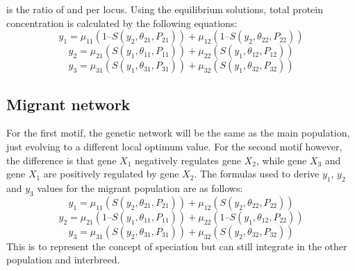 \textit{\textmu} is the ratio of \textalpha and \textgamma per locus. Using the equilibrium solutions, total protein concentration is calculated by the following equations:
\begin{equation*}
    y_1 = \mu_{11}(1 – S(y_2, \theta_{21}, P_{21})) + \mu_{12}(1 – S(y_{2}, \theta_{22}, P_{22})) \label{eq:y1 function} \tag{5.1}
\end{equation*}
\begin{equation*}
    y_2 = \mu_{21}(S(y_{1}, \theta_{11}, P_{11})) + \mu_{22}(S(y_{1}, \theta_{12}, P_{12})) \label{eq:y2 function} \tag{5.2}
\end{equation*}
\begin{equation*}
    y_3 = \mu_{31}(S(y_{1}, \theta_{31}, P_{31})) + \mu_{32}(S(y_{1}, \theta_{32}, P_{32})) \label{eq:y3 function} \tag{5.3}
\end{equation*}
\subsection{Migrant network}
For the first motif, the genetic network will be the same as the main population, just evolving to a different local optimum value. For the second motif however, the difference is that gene $X_1$ negatively regulates gene $X_2$, while gene $X_3$ and gene $X_1$ are positively regulated by gene $X_2$. The formulas used to derive $y_1$, $y_2$ and $y_3$ values for the migrant population are as follows:
\begin{equation*}
    y_1 = \mu_{11}(S(y_2, \theta_{21}, P_{21})) + \mu_{12}(S(y_2, \theta_{22}, P_{22})) \label{eq:y1 function} \tag{6.1}
\end{equation*}
\begin{equation*}
    y_2 = \mu_{21}(1 – S(y_1, \theta_{11}, P_{11})) + \mu_{22}(1 – S(y_1, \theta_{12}, P_{22})) \label{eq:y2 function} \tag{6.2}
\end{equation*}
\begin{equation*}
    y_3 = \mu_{31}(S(y_2, \theta_{31}, P_{31})) + \mu_{32}(S(y_2, \theta_{32}, P_{32})) \label{eq:y3 function} \tag{6.3}
\end{equation*}
This is to represent the concept of speciation but can still integrate in the other population and interbreed.
